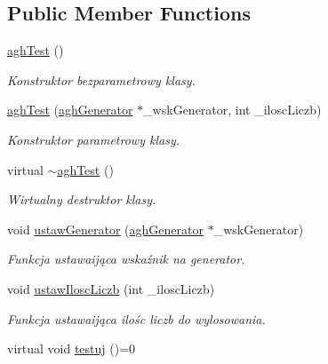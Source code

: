 \subsection*{\-Public \-Member \-Functions}
\begin{DoxyCompactItemize}
\item 
\hypertarget{classaghTest_ad401b4396042eec67f799a3321c24da6}{\hyperlink{classaghTest_ad401b4396042eec67f799a3321c24da6}{agh\-Test} ()}\label{classaghTest_ad401b4396042eec67f799a3321c24da6}

\begin{DoxyCompactList}\small\item\em \-Konstruktor bezparametrowy klasy. \end{DoxyCompactList}\item 
\hyperlink{classaghTest_a1e64dbd5d26b0852983b94fee03d3acf}{agh\-Test} (\hyperlink{classaghGenerator}{agh\-Generator} $\ast$\-\_\-wsk\-Generator, int \-\_\-ilosc\-Liczb)
\begin{DoxyCompactList}\small\item\em \-Konstruktor parametrowy klasy. \end{DoxyCompactList}\item 
\hypertarget{classaghTest_ae4906739e0f9e889febd23a43803b481}{virtual \hyperlink{classaghTest_ae4906739e0f9e889febd23a43803b481}{$\sim$agh\-Test} ()}\label{classaghTest_ae4906739e0f9e889febd23a43803b481}

\begin{DoxyCompactList}\small\item\em \-Wirtualny destruktor klasy. \end{DoxyCompactList}\item 
void \hyperlink{classaghTest_a971401190c3ddb295c8f09fe40291ae7}{ustaw\-Generator} (\hyperlink{classaghGenerator}{agh\-Generator} $\ast$\-\_\-wsk\-Generator)
\begin{DoxyCompactList}\small\item\em \-Funkcja ustawaijąca wskaźnik na generator. \end{DoxyCompactList}\item 
void \hyperlink{classaghTest_a69b1abb67e748e5077c0d8dbf798bb95}{ustaw\-Ilosc\-Liczb} (int \-\_\-ilosc\-Liczb)
\begin{DoxyCompactList}\small\item\em \-Funkcja ustawaijąca ilośc liczb do wylosowania. \end{DoxyCompactList}\item 
\hypertarget{classaghTest_aedc07452db24c0b2389599fbb5a25e03}{virtual void \hyperlink{classaghTest_aedc07452db24c0b2389599fbb5a25e03}{testuj} ()=0}\label{classaghTest_aedc07452db24c0b2389599fbb5a25e03}


\end{DoxyCompactItemize}
